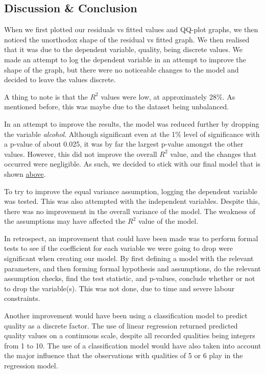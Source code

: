 \documentclass[a4paper,9pt,twocolumn,twoside,]{pinp}
\begin{document}
\hypertarget{discussion-conclusion}{%
\subsection{Discussion \& Conclusion}\label{discussion-conclusion}}

When we first plotted our residuals vs fitted values and QQ-plot graphs,
we then noticed the unorthodox shape of the residual vs fitted graph. We
then realised that it was due to the dependent variable, quality, being
discrete values. We made an attempt to log the dependent variable in an
attempt to improve the shape of the graph, but there were no noticeable
changes to the model and decided to leave the values discrete.

A thing to note is that the \(R^2\) values were low, at approximately
28\%. As mentioned before, this was maybe due to the dataset being
unbalanced.

In an attempt to improve the results, the model was reduced further by
dropping the variable \emph{alcohol}. Although significant even at the
1\% level of significance with a p-value of about 0.025, it was by far
the largest p-value amongst the other values. However, this did not
improve the overall \(R^2\) value, and the changes that occurred were
negligible. As such, we decided to stick with our final model that is
shown \hyperref[eqn:model]{above}.

To try to improve the equal variance assumption, logging the dependent
variable was tested. This was also attempted with the independent
variables. Despite this, there was no improvement in the overall
variance of the model. The weakness of the assumptions may have affected
the \(R^2\) value of the model.

In retrospect, an improvement that could have been made was to perform
formal tests to see if the coefficient for each variable we were going
to drop were significant when creating our model. By first defining a
model with the relevant parameters, and then forming formal hypothesis
and assumptions, do the relevant assumption checks, find the test
statistic, and p-values, conclude whether or not to drop the
variable(s). This was not done, due to time and severe labour
constraints.

Another improvement would have been using a classification model to
predict quality as a discrete factor. The use of linear regression
returned predicted quality values on a continuous scale, despite all
recorded qualities being integers from 1 to 10. The use of a
classification model would have also taken into account the major
influence that the observations with qualities of 5 or 6 play in the
regression model.
\end{document}
